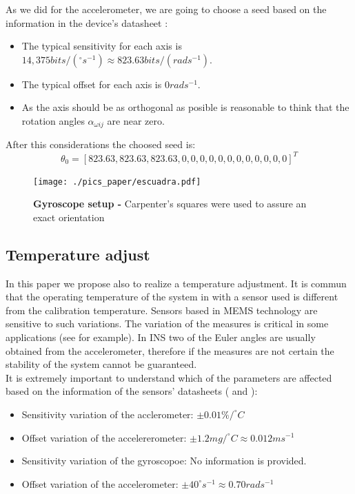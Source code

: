 \documentclass[conference]{IEEEtran}
\begin{document}
As we did for the accelerometer, we are going to choose a seed based on the information in the device's datasheet \cite{bib:gyro_data}: 

\begin{itemize}
\item The typical sensitivity for each axis is $14,375 bits/(^\circ s^{-1})\approx 823.63 bits/(rad s^{-1})$.
\item The typical offset for each axis is $0 rad s^{-1}$.
\item As the axis should be as orthogonal as posible is reasonable to think that the rotation angles $\alpha_{\omega ij}$ are near zero. 
\end{itemize}

After this considerations the choosed seed is:
\begin{equation}
{\theta}_0 = [823.63, 823.63, 823.63, 0, 0, 0, 0, 0, 0, 0, 0, 0, 0, 0, 0]^T
\end{equation}

\begin{figure}
	\centering
	\texttt{[image: ./pics\_paper/escuadra.pdf]}
	\caption{\textbf{Gyroscope setup - }Carpenter's squares were used to assure an exact orientation}
	\label{fig:setup_gyro}
\end{figure}


\subsection{Temperature adjust}

In this paper we propose also to realize a temperature adjustment. It is commun that the operating temperature of the system in with a sensor used is different from the calibration temperature. Sensors based in MEMS technology are sensitive to such variations. The variation of the measures is critical in some applications (see \cite{bib:uquad} for example). In INS two of the Euler angles are usually obtained from the accelerometer, therefore if the measures are not certain the stability of the system cannot be guaranteed.\\

It is extremely important to understand which of the parameters are affected based on the information of the sensors' datasheets (\cite{bib:acc_data} and \cite{bib:gyro_data}):

\begin{itemize}
\item Sensitivity variation of the acclerometer: $\pm 0.01 \%/^\circ C$
\item Offset variation of the accelererometer: $\pm 1.2mg/^\circ C \approx 0.012m s^{-1}$
\item Sensitivity variation of the gyroscopoe: No information is provided. 
\item Offset variation of the accelerometer: $\pm 40 ^\circ s^{-1} \approx 0.70 rad s^{-1}$
\end{itemize}
\end{document}
